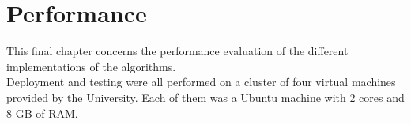 %       
%
\chapter{Performance}\label{ch:performance}
This final chapter concerns the performance evaluation of the different implementations of the algorithms.\\
Deployment and testing were all performed on a cluster of four virtual machines provided by the University. Each of them was a Ubuntu machine with 2 cores and 8 GB of RAM.\\